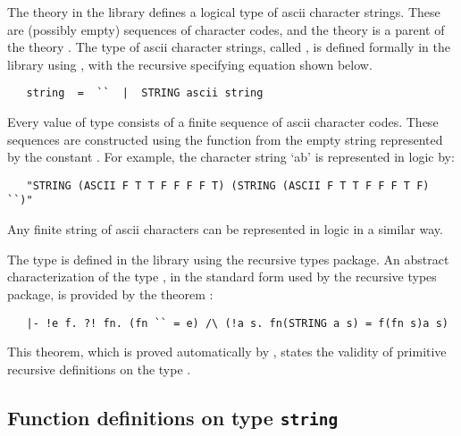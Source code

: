 The theory  in the library defines a logical type of ascii character
strings.  These are (possibly empty) sequences of character codes, and the
theory  is a parent of the theory . The type of ascii
character strings, called , is defined formally in the library using
, with the recursive specifying equation shown below.

\begin{hol}\begin{verbatim}
   string  =  ``  |  STRING ascii string
\end{verbatim}\end{hol}

\noindent Every value of type  consists of a finite sequence of
ascii character codes. These sequences are constructed using the function
 from the empty string represented by the constant .  For
example, the character string `ab' is represented in logic by:

\begin{hol}\begin{verbatim}
   "STRING (ASCII F T T F F F F T) (STRING (ASCII F T T F F F T F) ``)"
\end{verbatim}\end{hol}

\noindent Any finite string of ascii characters can be represented in logic in
a similar way.

The type  is defined in the library using the recursive types
package. An abstract characterization of the type , in the standard
form used by the recursive types package, is provided by the
theorem :

\begin{hol}
\begin{verbatim}
   |- !e f. ?! fn. (fn `` = e) /\ (!a s. fn(STRING a s) = f(fn s)a s)
\end{verbatim}\end{hol}

\noindent This theorem, which is proved automatically by ,
states the validity of primitive recursive definitions on the type .

\subsection{Function definitions on type {\tt string}}%

